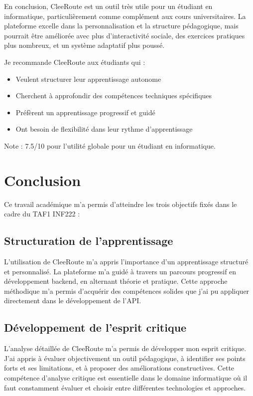 \documentclass[12pt,a4paper]{article}
\begin{document}
En conclusion, CleeRoute est un outil très utile pour un étudiant en informatique, particulièrement comme complément aux cours universitaires. La plateforme excelle dans la personnalisation et la structure pédagogique, mais pourrait être améliorée avec plus d'interactivité sociale, des exercices pratiques plus nombreux, et un système adaptatif plus poussé.

Je recommande CleeRoute aux étudiants qui :
\begin{itemize}
    \item Veulent structurer leur apprentissage autonome
    \item Cherchent à approfondir des compétences techniques spécifiques
    \item Préfèrent un apprentissage progressif et guidé
    \item Ont besoin de flexibilité dans leur rythme d'apprentissage
\end{itemize}

Note : 7.5/10 pour l'utilité globale pour un étudiant en informatique.

\newpage

\section{Conclusion}

Ce travail académique m'a permis d'atteindre les trois objectifs fixés dans le cadre du TAF1 INF222 :

\subsection{Structuration de l'apprentissage}

L'utilisation de CleeRoute m'a appris l'importance d'un apprentissage structuré et personnalisé. La plateforme m'a guidé à travers un parcours progressif en développement backend, en alternant théorie et pratique. Cette approche méthodique m'a permis d'acquérir des compétences solides que j'ai pu appliquer directement dans le développement de l'API.

\subsection{Développement de l'esprit critique}

L'analyse détaillée de CleeRoute m'a permis de développer mon esprit critique. J'ai appris à évaluer objectivement un outil pédagogique, à identifier ses points forts et ses limitations, et à proposer des améliorations constructives. Cette compétence d'analyse critique est essentielle dans le domaine informatique où il faut constamment évaluer et choisir entre différentes technologies et approches.
\end{document}
